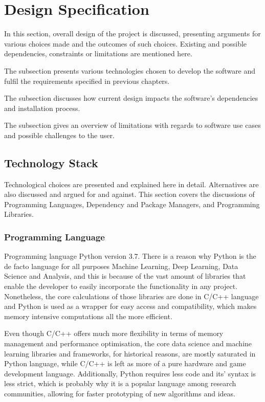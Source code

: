 \section{Design Specification}
    In this section, overall design of the project is discussed, presenting arguments for various choices made and the outcomes of such choices. Existing and possible dependencies, constraints or limitations are mentioned here.
    
    The  subsection presents various technologies chosen to develop the software and fulfil the requirements specified in previous chapters.
    
    The  subsection discusses how current design impacts the software's dependencies and installation process.
    
    The  subsection gives an overview of limitations with regards to software use cases and possible challenges to the user. 
    
    \subsection{Technology Stack} \label{techstack}
        Technological choices are presented and explained here in detail. Alternatives are also discussed and argued for and against. This section covers the discussions of Programming Languages, Dependency and Package Managers, and Programming Libraries.
        
        \subsubsection{Programming Language}
            Programming language Python version 3.7. There is a reason why Python is the de facto language for all purposes Machine Learning, Deep Learning, Data Science and Analysis, and this is because of the vast amount of libraries that enable the developer to easily incorporate the functionality in any project. Nonetheless, the core calculations of those libraries are done in C/C++ language and Python is used as a wrapper for easy access and compatibility, which makes memory intensive computations all the more efficient. 
            
            Even though C/C++ offers much more flexibility in terms of memory management and performance optimisation, the core data science and machine learning libraries and frameworks, for historical reasons, are mostly saturated in Python language, while C/C++ is left as more of a pure hardware and game development language. Additionally, Python requires less code and its' syntax is less strict, which is probably why it is a popular language among research communities, allowing for faster prototyping of new algorithms and ideas.
            
